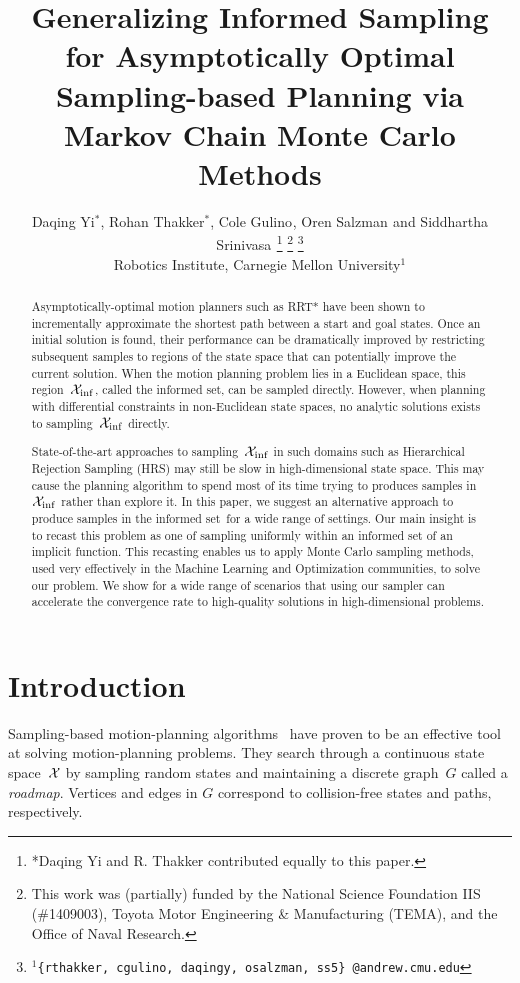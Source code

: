 \documentclass[letterpaper, 10 pt, conference]{ieeeconf}  %
\title{\LARGE \bf
Generalizing Informed Sampling
for Asymptotically Optimal Sampling-based Planning via Markov Chain
Monte Carlo Methods
}
\author{
Daqing Yi$^{*}$,
Rohan Thakker$^{*}$,
Cole Gulino$^{}$, 
Oren Salzman$^{}$ and
Siddhartha Srinivasa$^{}$%
\thanks{*Daqing Yi and R. Thakker contributed equally to this paper.}
\thanks{This work was (partially) funded by the National Science Foundation IIS (\#1409003), Toyota Motor Engineering \& Manufacturing (TEMA), and the Office of Naval Research.}%
\thanks{$^{1}${\tt\small \{rthakker, cgulino, daqingy, osalzman, ss5\} @andrew.cmu.edu}}%
%
\\        
Robotics Institute, Carnegie Mellon University$^{1}$
}
\begin{document}
\maketitle
\thispagestyle{empty}
\pagestyle{empty}


\begin{abstract}
Asymptotically-optimal motion planners such as RRT* have been shown to incrementally approximate the shortest path between a start and goal states.
Once an initial solution is found, their performance can be dramatically improved by restricting subsequent samples to regions of the state space that can potentially improve the current solution.
When the motion planning problem lies in a Euclidean space, this region~$\mathcal{X}_{\rm {inf}}$, called the informed set, can be sampled directly.
However, when planning with differential constraints in non-Euclidean state spaces, no analytic solutions exists to sampling~$\mathcal{X}_{\rm {inf}}$ directly.

State-of-the-art approaches to sampling~$\mathcal{X}_{\rm {inf}}$ in such domains such as Hierarchical Rejection Sampling (HRS) may still be slow in high-dimensional state space.
This may cause the planning algorithm to spend most of its time trying to produces samples in~$\mathcal{X}_{\rm {inf}}$ rather than explore it.
In this paper, we suggest an alternative approach to produce samples in the informed set~\Cinf for a wide range of settings.
Our main insight is to recast this problem as one of sampling uniformly within an informed set of an implicit function.
This recasting enables us to apply Monte Carlo sampling methods, used very effectively in the Machine Learning and Optimization communities, to solve our problem.
We show for a wide range of scenarios that using our sampler can accelerate the convergence rate to high-quality solutions in high-dimensional problems.
\end{abstract}


\section{Introduction}
\label{sec:intro}


Sampling-based motion-planning algorithms~\cite{CBHKKLT05, L06} have proven to be an effective tool at solving motion-planning problems.
They search through a continuous state space~$\mathcal{X}$ by sampling random states and maintaining a discrete graph~$G$ called a \emph{roadmap}.
Vertices and edges in $G$ correspond to collision-free states and paths, respectively.
\end{document}
